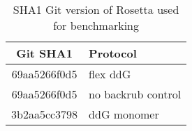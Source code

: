 \begin{table}
  \begin{tabular}{cl}
    \toprule
    Git SHA1 &                        Protocol \\
    \midrule
    69aa5266f0d5 & flex ddG \\
    69aa5266f0d5 & no backrub control \\
    3b2aa5cc3798 & ddG monomer \\
\bottomrule
\end{tabular}

  \caption{SHA1 Git version of Rosetta used for benchmarking} \label{tab:table-versions}
\end{table}
